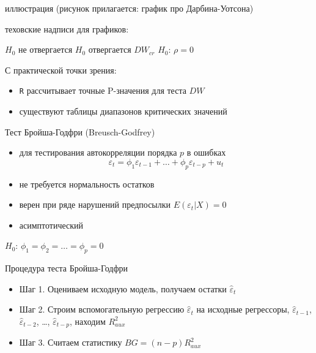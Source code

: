 \documentclass[ignorenonframetext,]{beamer}
\begin{document}
\begin{frame}{иллюстрация (рисунок прилагается: график про
Дарбина-Уотсона)}

теховские надписи для графиков:

$H_0$ не отвергается $H_0$ отвергается $DW_{cr}$ $H_0$: $\rho=0$

\end{frame}

\begin{frame}{С практической точки зрения:}

\begin{itemize}
\item
  \texttt{R} рассчитывает точные P-значения для теста $DW$
\item
  существуют таблицы диапазонов критических значений
\end{itemize}

\end{frame}

\begin{frame}{Тест Бройша-Годфри (Breusch-Godfrey)}

\begin{itemize}
\item
  для тестирования автокорреляции порядка $p$ в ошибках \[
  \varepsilon_t=\phi_1 \varepsilon_{t-1} + \ldots + \phi_p \varepsilon_{t-p} + u_t
  \]
\item
  не требуется нормальность остатков
\item
  верен при ряде нарушений предпосылки $E(\varepsilon_t | X)=0$
\item
  асимптотический
\end{itemize}

$H_0$: $\phi_1=\phi_2=\ldots=\phi_p=0$

\end{frame}

\begin{frame}{Процедура теста Бройша-Годфри}

\begin{itemize}
\item
  Шаг 1. Оцениваем исходную модель, получаем остатки
  $\hat{\varepsilon}_t$
\item
  Шаг 2. Строим вспомогательную регрессию $\hat{\varepsilon}_t$ на
  исходные регрессоры, $\hat{\varepsilon}_{t-1}$,
  $\hat{\varepsilon}_{t-2}$, \ldots{}, $\hat{\varepsilon}_{t-p}$,
  находим $R^2_{aux}$
\item
  Шаг 3. Считаем статистику $BG=(n-p)R^2_{aux}$
\end{itemize}

\end{frame}
\end{document}
